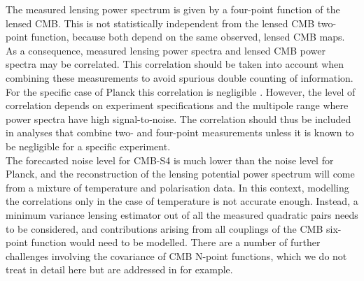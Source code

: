 The measured lensing power spectrum is given by a four-point function of the lensed CMB. 
This is not statistically independent from the lensed CMB two-point function, because both depend on the same observed, lensed CMB maps. 
As a consequence, measured lensing power spectra and lensed CMB power spectra may be correlated. 
This correlation should be taken into account when combining these measurements to avoid spurious double counting of information. 
For the specific case of Planck this correlation is negligible \cite{Schmittfull:2013uea}. 
However, the level of correlation depends on experiment specifications and the multipole range where power spectra have high signal-to-noise. 
The correlation should thus be included in analyses that combine two- and four-point measurements unless it is known to be negligible for a specific experiment.
\\

The forecasted noise level for CMB-S4 is much lower than the noise level for Planck, and the reconstruction of the lensing potential power spectrum will come from a mixture of temperature and polarisation data.
In this context, modelling the correlations only in the case of temperature is not accurate enough.
Instead, a minimum variance lensing estimator out of all the measured quadratic pairs needs to be considered, and contributions arising from all couplings of the CMB six-point function would need to be modelled.
There are a number of further challenges involving the covariance of CMB N-point functions, which we do not treat in detail here but are addressed in \cite{Peloton:prep} for example. 
\\

